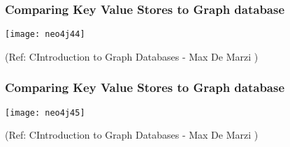 \begin{frame}\frametitle{Comparing Key Value Stores to Graph database}

\begin{center}
\texttt{[image: neo4j44]}
\end{center}	  


{\tiny (Ref: CIntroduction to Graph Databases - Max De Marzi )}
\end{frame}

\begin{frame}\frametitle{Comparing Key Value Stores to Graph database}

\begin{center}
\texttt{[image: neo4j45]}
\end{center}	  


{\tiny (Ref: CIntroduction to Graph Databases - Max De Marzi )}
\end{frame}













